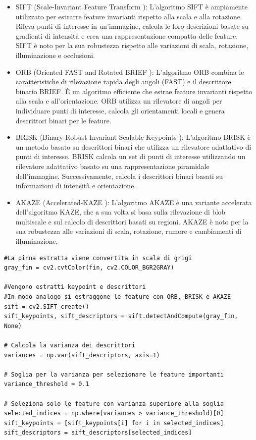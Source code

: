 \documentclass[a4paper,12pt]{report}
\begin{document}
    \begin{itemize}
      \item SIFT (Scale-Invariant Feature Transform \cite{lowe2004distinctive}): L'algoritmo SIFT è ampiamente utilizzato per estrarre feature invarianti rispetto alla scala e alla rotazione. Rileva punti di interesse in un'immagine, calcola le loro descrizioni basate su gradienti di intensità e crea una rappresentazione compatta delle feature. SIFT è noto per la sua robustezza rispetto alle variazioni di scala, rotazione, illuminazione e occlusioni.
      \item ORB (Oriented FAST and Rotated BRIEF \cite{rublee2011orb}): L'algoritmo ORB combina le caratteristiche di rilevazione rapida degli angoli (FAST) e il descrittore binario BRIEF. È un algoritmo efficiente che estrae feature invarianti rispetto alla scala e all'orientazione. ORB utilizza un rilevatore di angoli per individuare punti di interesse, calcola gli orientamenti locali e genera descrittori binari per le feature.
      \newpage
      \item BRISK (Binary Robust Invariant Scalable Keypoints \cite{leutenegger2011brisk}): L'algoritmo BRISK è un metodo basato su descrittori binari che utilizza un rilevatore adattativo di punti di interesse. BRISK calcola un set di punti di interesse utilizzando un rilevatore adattativo basato su una rappresentazione piramidale dell'immagine. Successivamente, calcola i descrittori binari basati su informazioni di intensità e orientazione.
      \item AKAZE (Accelerated-KAZE \cite{alcantarilla2012fast}): L'algoritmo AKAZE è una variante accelerata dell'algoritmo KAZE, che a sua volta si basa sulla rilevazione di blob multiscale e sul calcolo di descrittori basati su regioni. AKAZE è noto per la sua robustezza alle variazioni di scala, rotazione, rumore e cambiamenti di illuminazione.
    \end{itemize}
\begin{lstlisting}
#La pinna estratta viene convertita in scala di grigi
gray_fin = cv2.cvtColor(fin, cv2.COLOR_BGR2GRAY)

#Vengono estratti keypoint e descrittori
#In modo analogo si estraggone le feature con ORB, BRISK e AKAZE
sift = cv2.SIFT_create()
sift_keypoints, sift_descriptors = sift.detectAndCompute(gray_fin, None)

# Calcola la varianza dei descrittori
variances = np.var(sift_descriptors, axis=1)

# Soglia per la varianza per selezionare le feature importanti
variance_threshold = 0.1

# Seleziona solo le feature con varianza superiore alla soglia
selected_indices = np.where(variances > variance_threshold)[0]
sift_keypoints = [sift_keypoints[i] for i in selected_indices]
sift_descriptors = sift_descriptors[selected_indices]
\end{lstlisting}
\end{document}
